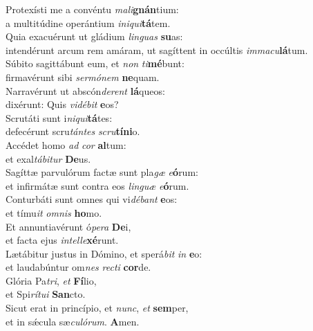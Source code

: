 \evenverse Protexísti me a convéntu \textit{ma}\textit{li}\textbf{gnán}tium:~\*\\
\evenverse a multitúdine operántium \textit{i}\textit{ni}\textit{qui}\textbf{tá}tem.\\
\oddverse Quia exacuérunt ut gládium \textit{lin}\textit{guas} \textbf{su}as:~\*\\
\oddverse intendérunt arcum rem amáram, ut sagíttent in occúltis \textit{im}\textit{ma}\textit{cu}\textbf{lá}tum.\\
\evenverse Súbito sagittábunt eum, et \textit{non} \textit{ti}\textbf{mé}bunt:~\*\\
\evenverse firmavérunt sibi \textit{ser}\textit{mó}\textit{nem} \textbf{ne}quam.\\
\oddverse Narravérunt ut abscón\textit{de}\textit{rent} \textbf{lá}queos:~\*\\
\oddverse dixérunt: Quis \textit{vi}\textit{dé}\textit{bit} \textbf{e}os?\\
\evenverse Scrutáti sunt i\textit{ni}\textit{qui}\textbf{tá}tes:~\*\\
\evenverse defecérunt scru\textit{tán}\textit{tes} \textit{scru}\textbf{tí}\textbf{ni}o.\\
\oddverse Accédet homo \textit{ad} \textit{cor} \textbf{al}tum:~\*\\
\oddverse et exal\textit{tá}\textit{bi}\textit{tur} \textbf{De}us.\\
\evenverse Sagíttæ parvulórum factæ sunt pla\textit{gæ} \textit{e}\textbf{ó}rum:~\*\\
\evenverse et infirmátæ sunt contra eos \textit{lin}\textit{guæ} \textit{e}\textbf{ó}rum.\\
\oddverse Conturbáti sunt omnes qui vi\textit{dé}\textit{bant} \textbf{e}os:~\*\\
\oddverse et tímu\textit{it} \textit{om}\textit{nis} \textbf{ho}mo.\\
\evenverse Et annuntiavérunt ó\textit{pe}\textit{ra} \textbf{De}i,~\*\\
\evenverse et facta ejus \textit{in}\textit{tel}\textit{le}\textbf{xé}runt.\\
\oddverse Lætábitur justus in Dómino, et sperá\textit{bit} \textit{in} \textbf{e}o:~\*\\
\oddverse et laudabúntur om\textit{nes} \textit{re}\textit{cti} \textbf{cor}de.\\
\evenverse Glória Pa\textit{tri}, \textit{et} \textbf{Fí}lio,~\*\\
\evenverse et Spi\textit{rí}\textit{tu}\textit{i} \textbf{San}cto.\\
\oddverse Sicut erat in princípio, et \textit{nunc}, \textit{et} \textbf{sem}per,~\*\\
\oddverse et in sǽcula sæ\textit{cu}\textit{ló}\textit{rum}. \textbf{A}men.\\

